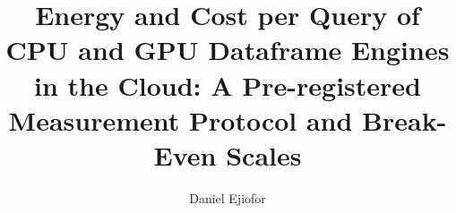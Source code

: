 \documentclass[sigconf]{acmart}
\begin{document}
\title[Energy and Cost per Query of CPU and GPU Dataframe Engines]{Energy and Cost per Query of
  CPU and GPU Dataframe Engines in the Cloud: A Pre-registered Measurement Protocol and
  Break-Even Scales}

\author{Daniel Ejiofor}
\end{document}
